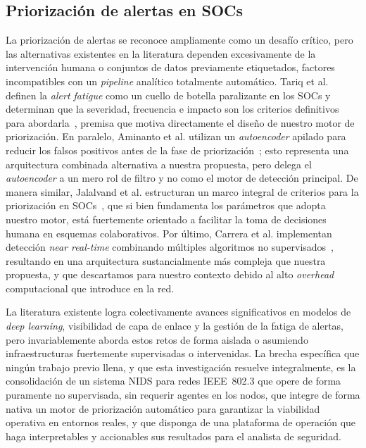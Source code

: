 \documentclass[conference]{IEEEtran}
\begin{document}
\subsection{Priorización de alertas en SOCs}
La priorización de alertas se reconoce ampliamente como un desafío
crítico, pero las alternativas existentes en la literatura dependen
excesivamente de la intervención humana o conjuntos de datos previamente
etiquetados, factores incompatibles con un \textit{pipeline} analítico
totalmente automático. Tariq et al. definen la \textit{alert fatigue}
como un cuello de botella paralizante en los SOCs y determinan que la
severidad, frecuencia e impacto son los criterios definitivos para
abordarla~\cite{tariq2025}, premisa que motiva directamente el diseño de
nuestro motor de priorización. En paralelo, Aminanto et al. utilizan un
\textit{autoencoder} apilado para reducir los falsos positivos antes de
la fase de priorización~\cite{aminanto2020}; esto representa una
arquitectura combinada alternativa a nuestra propuesta, pero delega el
\textit{autoencoder} a un mero rol de filtro y no como el motor de
detección principal. De manera similar, Jalalvand et al. estructuran un
marco integral de criterios para la priorización en
SOCs~\cite{jalalvand2024}, que si bien fundamenta los parámetros que
adopta nuestro motor, está fuertemente orientado a facilitar la toma de
decisiones humana en esquemas colaborativos. Por último, Carrera et al.
implementan detección \textit{near real-time} combinando múltiples
algoritmos no supervisados~\cite{carrera2022}, resultando en una
arquitectura sustancialmente más compleja que nuestra propuesta, y que
descartamos para nuestro contexto debido al alto \textit{overhead}
computacional que introduce en la red.
 
La literatura existente logra colectivamente avances significativos en
modelos de \textit{deep learning}, visibilidad de capa de enlace y la
gestión de la fatiga de alertas, pero invariablemente aborda estos retos
de forma aislada o asumiendo infraestructuras fuertemente supervisadas o
intervenidas. La brecha específica que ningún trabajo previo llena, y que
esta investigación resuelve integralmente, es la consolidación de un
sistema NIDS para redes IEEE~802.3 que opere de forma puramente no
supervisada, sin requerir agentes en los nodos, que integre de forma
nativa un motor de priorización automático para garantizar la viabilidad
operativa en entornos reales, y que disponga de una plataforma de
operación que haga interpretables y accionables sus resultados para el
analista de seguridad.
\end{document}
